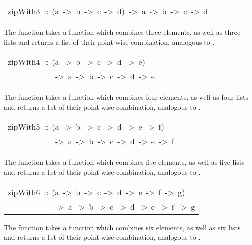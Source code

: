 \begin{haddockdesc}
\item[\begin{tabular}{@{}l}
zipWith3\ ::\ (a\ ->\ b\ ->\ c\ ->\ d)\ ->\ {\char 91}a{\char 93}\ ->\ {\char 91}b{\char 93}\ ->\ {\char 91}c{\char 93}\ ->\ {\char 91}d{\char 93}
\end{tabular}]\haddockbegindoc
The  function takes a function which combines three
 elements, as well as three lists and returns a list of their point-wise
 combination, analogous to .
\par

\end{haddockdesc}
\begin{haddockdesc}
\item[\begin{tabular}{@{}l}
zipWith4\ ::\ (a\ ->\ b\ ->\ c\ ->\ d\ ->\ e)\\\ \ \ \ \ \ \ \ \ \ \ \ ->\ {\char 91}a{\char 93}\ ->\ {\char 91}b{\char 93}\ ->\ {\char 91}c{\char 93}\ ->\ {\char 91}d{\char 93}\ ->\ {\char 91}e{\char 93}
\end{tabular}]\haddockbegindoc
The  function takes a function which combines four
 elements, as well as four lists and returns a list of their point-wise
 combination, analogous to .
\par

\end{haddockdesc}
\begin{haddockdesc}
\item[\begin{tabular}{@{}l}
zipWith5\ ::\ (a\ ->\ b\ ->\ c\ ->\ d\ ->\ e\ ->\ f)\\\ \ \ \ \ \ \ \ \ \ \ \ ->\ {\char 91}a{\char 93}\ ->\ {\char 91}b{\char 93}\ ->\ {\char 91}c{\char 93}\ ->\ {\char 91}d{\char 93}\ ->\ {\char 91}e{\char 93}\ ->\ {\char 91}f{\char 93}
\end{tabular}]\haddockbegindoc
The  function takes a function which combines five
 elements, as well as five lists and returns a list of their point-wise
 combination, analogous to .
\par

\end{haddockdesc}
\begin{haddockdesc}
\item[\begin{tabular}{@{}l}
zipWith6\ ::\ (a\ ->\ b\ ->\ c\ ->\ d\ ->\ e\ ->\ f\ ->\ g)\\\ \ \ \ \ \ \ \ \ \ \ \ ->\ {\char 91}a{\char 93}\ ->\ {\char 91}b{\char 93}\ ->\ {\char 91}c{\char 93}\ ->\ {\char 91}d{\char 93}\ ->\ {\char 91}e{\char 93}\ ->\ {\char 91}f{\char 93}\ ->\ {\char 91}g{\char 93}
\end{tabular}]\haddockbegindoc
The  function takes a function which combines six
 elements, as well as six lists and returns a list of their point-wise
 combination, analogous to .
\par

\end{haddockdesc}
